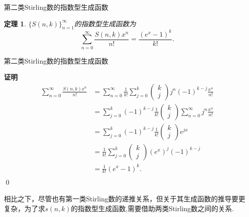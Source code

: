 \documentclass[punct]{ctexbeamer}
\newtheorem{thm}{定理}[section]
\begin{document}
\begin{frame}{第二类Stirling数的指数型生成函数}
	\begin{thm}
		$\{S(n,k)\}_{n=1}^{\infty}$的指数型生成函数为
			$$\sum_{n=0}^{\infty} \frac{S(n, k) x^n}{n !}=\frac{\left(e^x-1\right)^k}{k !} . $$
	\end{thm}
\end{frame}	

\begin{frame}{第二类Stirling数的指数型生成函数}
	
	{\bf 证明}
	$$
	\begin{aligned}
	\sum_{n=0}^{\infty} \frac{S(n, k) x^n}{n !}&=\sum_{n=0}^{\infty} \frac{1}{k !} \sum_{j=0}^k\left(\begin{array}{c}
		k \\
		j
	\end{array}\right) j^n(-1)^{k-j} \frac{x^n}{n !} \\
    &=\sum_{j=0}^k(-1)^{k-j} \frac{1}{k !}\left(\begin{array}{c}
    	k \\
    	j
    \end{array}\right) \sum_{n=0}^{\infty} j^n \frac{x^n}{n !} \\
   &=\sum_{j=0}^k(-1)^{k-j} \frac{1}{k !}\left(\begin{array}{c}
	k \\
	j
   \end{array}\right) e^{j x} \\
   &=\frac{1}{k !} \sum_{j=0}^k\left(\begin{array}{c}
   k \\
   j
   \end{array}\right) (e^{x})^j (-1)^{k-j}\\
   &=\frac{1}{k !}(e^{x}-1)^k.\\\end{aligned}$$\qed

相比之下，尽管也有第一类Stirling数的递推关系，但关于其生成函数的推导要更复杂，为了求$s(n, k)$的指数型生成函数,需要借助两类Stirling数之间的关系.

\end{frame}	
\end{document}
